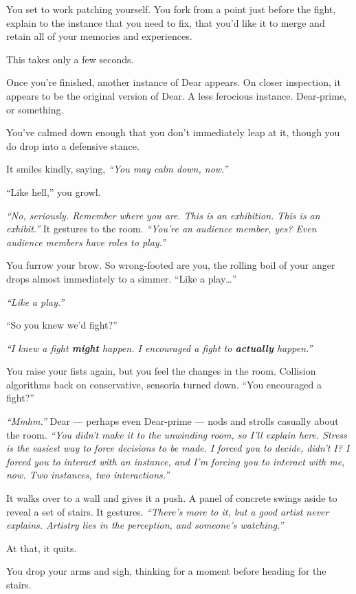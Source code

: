 You set to work patching yourself. You fork from a point just before the fight, explain to the instance that you need to fix, that you'd like it to merge and retain all of your memories and experiences.

This takes only a few seconds.

Once you're finished, another instance of Dear appears. On closer inspection, it appears to be the original version of Dear. A less ferocious instance. Dear-prime, or something.

You've calmed down enough that you don't immediately leap at it, though you do drop into a defensive stance.

It smiles kindly, saying, \emph{``You may calm down, now.''}

``Like hell,'' you growl.

\emph{``No, seriously. Remember where you are. This is an exhibition. This is an exhibit.''} It gestures to the room. \emph{``You're an audience member, yes? Even audience members have roles to play.''}

You furrow your brow. So wrong-footed are you, the rolling boil of your anger drops almost immediately to a simmer. ``Like a play\ldots{}''

\emph{``Like a play.''}

``So you knew we'd fight?''

\emph{``I knew a fight \textbf{might} happen. I encouraged a fight to \textbf{actually} happen.''}

You raise your fists again, but you feel the changes in the room. Collision algorithms back on conservative, sensoria turned down. ``You encouraged a fight?''

\emph{``Mmhm.''} Dear --- perhaps even Dear-prime --- nods and strolls casually about the room. \emph{``You didn't make it to the unwinding room, so I'll explain here. Stress is the easiest way to force decisions to be made. I forced you to decide, didn't I? I forced you to interact with an instance, and I'm forcing you to interact with me, now. Two instances, two interactions.''}

It walks over to a wall and gives it a push. A panel of concrete swings aside to reveal a set of stairs.  It gestures. \emph{``There's more to it, but a good artist never explains. Artistry lies in the perception, and someone's watching.''}

At that, it quits.

You drop your arms and sigh, thinking for a moment before heading for the stairs.

